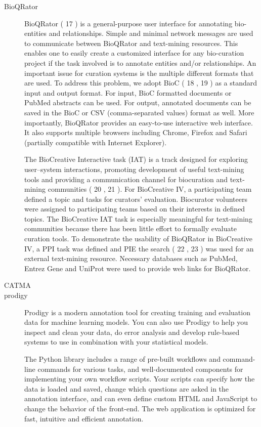 \begin{description}
    \item[BioQRator]
    BioQRator ( 17 ) is a general-purpose user interface for annotating bio-entities and relationships. Simple and minimal network messages are used to communicate between BioQRator and text-mining resources. This enables one to easily create a customized interface for any bio-curation project if the task involved is to annotate entities and/or relationships. An important issue for curation systems is the multiple different formats that are used. To address this problem, we adopt BioC ( 18 , 19 ) as a standard input and output format. For input, BioC formatted documents or PubMed abstracts can be used. For output, annotated documents can be saved in the BioC or CSV (comma-separated values) format as well. More importantly, BioQRator provides an easy-to-use interactive web interface. It also supports multiple browsers including Chrome, Firefox and Safari (partially compatible with Internet Explorer).

    The BioCreative Interactive task (IAT) is a track designed for exploring user–system interactions, promoting development of useful text-mining tools and providing a communication channel for biocuration and text-mining communities ( 20 , 21 ). For BioCreative IV, a participating team defined a topic and tasks for curators’ evaluation. Biocurator volunteers were assigned to participating teams based on their interests in defined topics. The BioCreative IAT task is especially meaningful for text-mining communities because there has been little effort to formally evaluate curation tools. To demonstrate the usability of BioQRator in BioCreative IV, a PPI task was defined and PIE the search ( 22 , 23 ) was used for an external text-mining resource. Necessary databases such as PubMed, Entrez Gene and UniProt were used to provide web links for BioQRator.

    \item[CATMA]


    \item[prodigy]

    Prodigy is a modern annotation tool for creating training and evaluation data for machine learning models. You can also use Prodigy to help you inspect and clean your data, do error analysis and develop rule-based systems to use in combination with your statistical models.

    The Python library includes a range of pre-built workflows and command-line commands for various tasks, and well-documented components for implementing your own workflow scripts. Your scripts can specify how the data is loaded and saved, change which questions are asked in the annotation interface, and can even define custom HTML and JavaScript to change the behavior of the front-end. The web application is optimized for fast, intuitive and efficient annotation.


\end{description}
